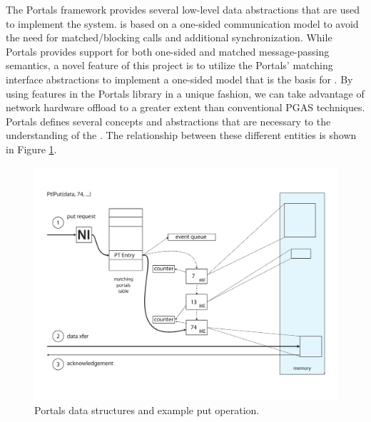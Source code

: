 

The Portals framework provides several low-level data abstractions that
are used to implement the \pdht system. \pdht is based on a one-sided
communication model to avoid the need for matched/blocking calls and
additional synchronization. While Portals provides support for both
one-sided and matched message-passing semantics, a novel feature of
this project is to utilize the Portals' matching interface
abstractions to implement a one-sided model that is the basis for
\pdht. By using features in the Portals library in a unique fashion,
we can take advantage of network hardware offload  to a greater extent
than conventional PGAS techniques. Portals defines several concepts
and abstractions that are necessary to the understanding of the
\pdht. The relationship between these different entities is shown in
Figure \ref{fig:portals_put}.

\begin{figure}[ht]
  \centering
  \includegraphics[width=\linewidth]{figs/portals_put}
  \caption{Portals data structures and example put operation.}
  \label{fig:portals_put}
\end{figure}

